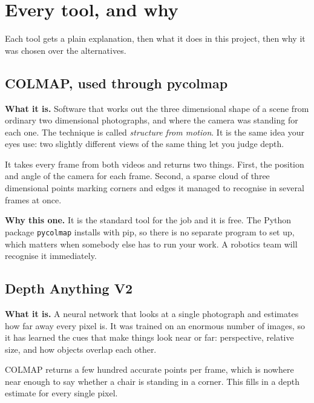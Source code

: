 \chapter{Every tool, and why}

Each tool gets a plain explanation, then what it does in this project, then why it was chosen over
the alternatives.

\section{COLMAP, used through pycolmap}

\begin{plainbox}
\textbf{What it is.} Software that works out the three dimensional shape of a scene from ordinary
two dimensional photographs, and where the camera was standing for each one. The technique is
called \emph{structure from motion}. It is the same idea your eyes use: two slightly different
views of the same thing let you judge depth.
\end{plainbox}

\begin{project}
It takes every frame from both videos and returns two things. First, the position and angle of the
camera for each frame. Second, a sparse cloud of three dimensional points marking corners and edges
it managed to recognise in several frames at once.
\end{project}

\textbf{Why this one.} It is the standard tool for the job and it is free. The Python package
\texttt{pycolmap} installs with pip, so there is no separate program to set up, which matters when
somebody else has to run your work. A robotics team will recognise it immediately.

\section{Depth Anything V2}

\begin{plainbox}
\textbf{What it is.} A neural network that looks at a single photograph and estimates how far away
every pixel is. It was trained on an enormous number of images, so it has learned the cues that
make things look near or far: perspective, relative size, and how objects overlap each other.
\end{plainbox}

\begin{project}
COLMAP returns a few hundred accurate points per frame, which is nowhere near enough to say whether
a chair is standing in a corner. This fills in a depth estimate for every single pixel.
\end{project}

